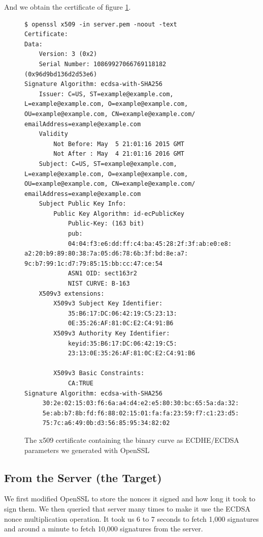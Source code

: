 \documentclass[a4paper,11pt]{article}
\begin{document}
And we obtain the certificate of figure 
\ref{fig:cert}.

\begin{figure}[H]
\begin{verbatim}
$ openssl x509 -in server.pem -noout -text
Certificate:
Data:
    Version: 3 (0x2)
    Serial Number: 10869927066769118182 (0x96d9bd136d2d53e6)
Signature Algorithm: ecdsa-with-SHA256
    Issuer: C=US, ST=example@example.com, L=example@example.com, O=example@example.com, OU=example@example.com, CN=example@example.com/ emailAddress=example@example.com
    Validity
        Not Before: May  5 21:01:16 2015 GMT
        Not After : May  4 21:01:16 2016 GMT
    Subject: C=US, ST=example@example.com, L=example@example.com, O=example@example.com, OU=example@example.com, CN=example@example.com/ emailAddress=example@example.com
    Subject Public Key Info:
        Public Key Algorithm: id-ecPublicKey
            Public-Key: (163 bit)
            pub: 
            04:04:f3:e6:dd:ff:c4:ba:45:28:2f:3f:ab:e0:e8:                                    a2:20:b9:89:80:38:7a:05:d6:78:6b:3f:bd:8e:a7:                                    9c:b7:99:1c:d7:79:85:15:bb:cc:47:ce:54
            ASN1 OID: sect163r2
            NIST CURVE: B-163
    X509v3 extensions:
        X509v3 Subject Key Identifier: 
            35:B6:17:DC:06:42:19:C5:23:13:
            0E:35:26:AF:81:0C:E2:C4:91:B6
        X509v3 Authority Key Identifier: 
            keyid:35:B6:17:DC:06:42:19:C5:
            23:13:0E:35:26:AF:81:0C:E2:C4:91:B6

        X509v3 Basic Constraints: 
            CA:TRUE
Signature Algorithm: ecdsa-with-SHA256
     30:2e:02:15:03:f6:6a:a4:d4:e2:e5:80:30:bc:65:5a:da:32:
     5e:ab:b7:8b:fd:f6:88:02:15:01:fa:fa:23:59:f7:c1:23:d5:
     75:7c:a6:49:0b:d3:56:85:95:34:82:02
\end{verbatim}
\caption{The x509 certificate containing the binary curve as ECDHE/ECDSA parameters we generated with OpenSSL}
\label{fig:cert}
\end{figure}

\subsection{From the Server (the Target)}

We first modified OpenSSL to store the nonces it signed and how long it took to sign them. We then queried that server many times to make it use the ECDSA nonce multiplication operation. It took us 6 to 7 seconds to fetch 1,000 signatures and around a minute to fetch 10,000 signatures from the server.
\end{document}
